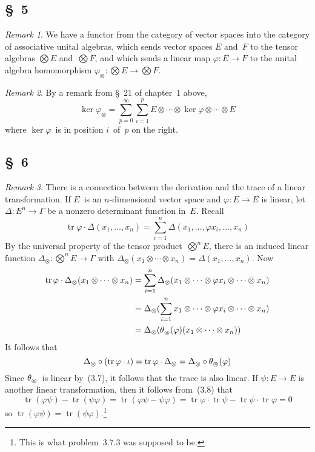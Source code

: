 \documentclass[letterpaper,12pt]{article}
\DeclareMathOperator{\tr}{tr}
\newcommand{\after}{\circ}
\newcommand{\mult}{\cdot}
\newcommand{\tprod}{\otimes}
\newcommand{\bigtprod}{\bigotimes}
\newcommand{\medtprod}{{\textstyle\bigtprod}}
\newcommand{\circled}[1]{\text{\tiny\textcircled{\textit{#1}}}}
\theoremstyle{definition}
\theoremstyle{remark}
\newtheorem*{rmk}{Remark}
\begin{document}
\subsection*{\S~5}
\begin{rmk}
We have a functor from the category of vector spaces into the category of associative unital algebras, which sends vector spaces \(E\) and~\(F\) to the tensor algebras \(\medtprod E\) and~\(\medtprod F\), and which sends a linear map \(\varphi:E\to F\) to the unital algebra homomorphism \(\varphi_{\tprod}:\medtprod E\to\medtprod F\).
\end{rmk}

\begin{rmk}
By a remark from \S~21 of chapter~1 above,
\[\ker\varphi_{\tprod}=\sum_{p=0}^{\infty}\sum_{i=1}^p E\tprod\cdots\tprod\ker\varphi\tprod\cdots\tprod E\]
where \(\ker\varphi\)~is in position \(i\)~of~\(p\) on the right.
\end{rmk}

\subsection*{\S~6}
\begin{rmk}
There is a connection between the derivation and the trace of a linear transformation. If \(E\)~is an \(n\)-dimensional vector space and \(\varphi:E\to E\) is linear, let \(\Delta:E^n\to\Gamma\) be a nonzero determinant function in~\(E\). Recall
\[\tr\varphi\mult\Delta(x_1,\ldots,x_n)=\sum_{i=1}^n\Delta(x_1,\ldots,\varphi x_i,\ldots,x_n)\]
By the universal property of the tensor product~\(\medtprod^n E\), there is an induced linear function \(\Delta_{\tprod}:\medtprod^n E\to\Gamma\) with \(\Delta_{\tprod}(x_1\tprod\cdots\tprod x_n)=\Delta(x_1,\ldots,x_n)\).
Now
\begin{align*}
\tr\varphi\mult\Delta_{\tprod}(x_1\tprod\cdots\tprod x_n)&=\sum_{i=1}^n \Delta_{\tprod}(x_1\tprod\cdots\tprod\varphi x_i\tprod\cdots\tprod x_n)\\
	&=\Delta_{\tprod}(\sum_{i=1}^n x_1\tprod\cdots\tprod\varphi x_i\tprod\cdots\tprod x_n)\\
	&=\Delta_{\tprod}(\theta_{\circled{n}}(\varphi)(x_1\tprod\cdots\tprod x_n))
\end{align*}
It follows that
\[\Delta_{\tprod}\after(\tr\varphi\mult\iota)=\tr\varphi\mult\Delta_{\tprod}=\Delta_{\tprod}\after\theta_{\circled{n}}(\varphi)\]
Since \(\theta_{\circled{n}}\)~is linear by~(3.7), it follows that the trace is also linear. If \(\psi:E\to E\) is another linear transformation, then it follows from~(3.8) that
\[\tr(\varphi\psi)-\tr(\psi\varphi)=\tr(\varphi\psi-\psi\varphi)=\tr\varphi\mult\tr\psi-\tr\psi\mult\tr\varphi=0\]
so \(\tr(\varphi\psi)=\tr(\psi\varphi)\).\footnote{This is what problem~3.7.3 was supposed to be.}
\end{rmk}
\end{document}
